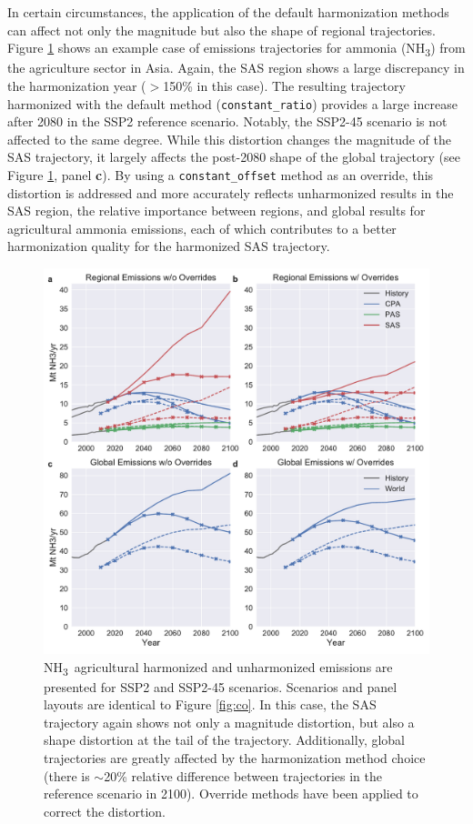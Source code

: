 \documentclass[review]{elsarticle}
\newcommand{\code}[1]{\lstinline[basicstyle=\ttfamily\color{black}]|#1|}
\newcommand{\nht}{NH\textsubscript{3}}
\newcommand{\nhtt}{NH\textsubscript{3}~}
\begin{document}
In certain circumstances, the application of the default harmonization methods
can affect not only the magnitude but also the shape of regional
trajectories. Figure \ref{fig:nh3} shows an example case of emissions
trajectories for ammonia (\nht) from the agriculture sector in Asia. Again, the
SAS region shows a large discrepancy in the harmonization year ($>$150\% in this
case). The resulting trajectory harmonized with the default method
(\code{constant_ratio}) provides a large increase after 2080 in the SSP2
reference scenario. Notably, the SSP2-45 scenario is not affected to the same
degree. While this distortion changes the magnitude of the SAS trajectory, it
largely affects the post-2080 shape of the global trajectory (see Figure
\ref{fig:nh3}, panel \textbf{c}). By using a \code{constant_offset} method as an
override, this distortion is addressed and more accurately reflects unharmonized
results in the SAS region, the relative importance between regions, and global
results for agricultural ammonia emissions, each of which contributes to a
better harmonization quality for the harmonized SAS trajectory.

\begin{figure}
  \begin{center}
    \includegraphics[width=\textwidth]{results_NH3_Agriculture.pdf}
    \caption[]{
      \label{fig:nh3}
      \nhtt agricultural harmonized and unharmonized emissions are presented for
      SSP2 and SSP2-45 scenarios. Scenarios and panel layouts are identical to
      Figure \ref{fig:co}. In this case, the SAS trajectory again shows not only
      a magnitude distortion, but also a shape distortion at the tail of the
      trajectory. Additionally, global trajectories are greatly affected by the
      harmonization method choice (there is $\sim$20\% relative difference
      between trajectories in the reference scenario in 2100). Override methods
      have been applied to correct the distortion.  }
  \end{center}
\end{figure}
\end{document}

